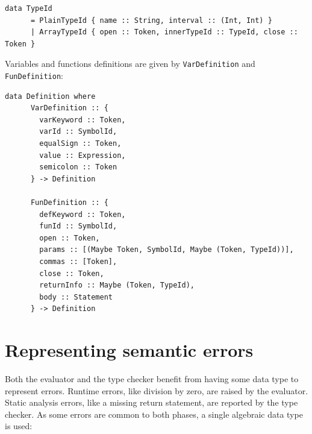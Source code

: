 \documentclass[UdineBachThesis,american,11pt]{PhdThesis}
\begin{document}
  \begin{Verbatim}[gobble=4,fontsize=\small]
    data TypeId
      = PlainTypeId { name :: String, interval :: (Int, Int) }
      | ArrayTypeId { open :: Token, innerTypeId :: TypeId, close :: Token }
  \end{Verbatim}

  Variables and functions definitions are given by \mbox{\texttt{VarDefinition}}
  and \mbox{\texttt{FunDefinition}}:

  \begin{Verbatim}[gobble=4,fontsize=\small]
    data Definition where
      VarDefinition :: {
        varKeyword :: Token,
        varId :: SymbolId,
        equalSign :: Token,
        value :: Expression,
        semicolon :: Token
      } -> Definition

      FunDefinition :: {
        defKeyword :: Token,
        funId :: SymbolId,
        open :: Token,
        params :: [(Maybe Token, SymbolId, Maybe (Token, TypeId))],
        commas :: [Token],
        close :: Token,
        returnInfo :: Maybe (Token, TypeId),
        body :: Statement
      } -> Definition
  \end{Verbatim}

  \section{Representing semantic errors}

  Both the evaluator and the type checker benefit from having some data type to
  represent errors. Runtime errors, like division by zero, are raised by the
  evaluator. Static analysis errors, like a missing return statement, are
  reported by the type checker. As some errors are common to both phases, a
  single algebraic data type is used:
\end{document}
